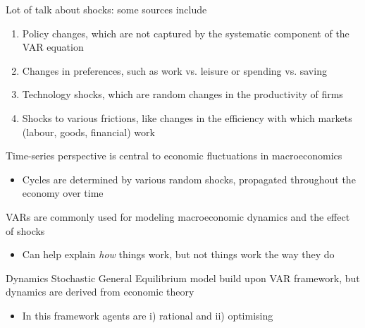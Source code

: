 \documentclass{beamer}
\begin{document}
\begin{frame}
  Lot of talk about shocks: some sources include
  \begin{enumerate}
    \item Policy changes, which are not captured by the systematic component of the VAR equation
    \item Changes in preferences, such as work vs. leisure or spending vs. saving
    \item Technology shocks, which are random changes in the productivity of firms
    \item Shocks to various frictions, like changes in the efficiency with which markets (labour, goods, financial) work
  \end{enumerate}
\end{frame}

\begin{frame}
 Time-series perspective is central to economic fluctuations in macroeconomics
 \begin{itemize}
   \item Cycles are determined by various random shocks, propagated throughout the economy over time
 \end{itemize}
 \medskip
 VARs are commonly used for modeling macroeconomic dynamics and the effect of shocks
 \begin{itemize}
   \item Can help explain \textit{how} things work, but not  things work the way they do   
 \end{itemize}
 \medskip
 Dynamics Stochastic General Equilibrium model build upon VAR framework, but dynamics are derived from economic theory
 \begin{itemize}
   \item In this framework agents are i) rational and ii) optimising
 \end{itemize}
\end{frame}








\end{document}
